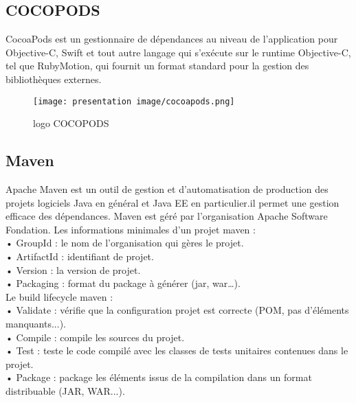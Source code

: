 \subsection{COCOPODS}
CocoaPods est un gestionnaire de dépendances au niveau de l'application pour Objective-C, Swift et tout autre langage qui s'exécute sur le runtime Objective-C, tel que RubyMotion, qui fournit un format standard pour la gestion des bibliothèques externes.
\begin{figure}[!h]
\begin{center}
\texttt{[image: presentation image/cocoapods.png]}
\end{center}
\caption{logo COCOPODS}
\end{figure}


\subsection{Maven}
Apache Maven est un outil de gestion et d'automatisation de production des projets logiciels Java en général et Java EE en particulier.il permet une gestion efficace des dépendances.
Maven est géré par l'organisation Apache Software Fondation. Les informations minimales d’un projet maven :\\

• GroupId : le nom de l’organisation qui gères le projet.\\

• ArtifactId : identifiant de projet.\\

• Version : la version de projet.\\

• Packaging : format du package à générer (jar, war…).\\

Le build lifecycle maven :\\

• Validate : vérifie que la configuration projet est correcte (POM, pas d'éléments manquants...).\\

• Compile : compile les sources du projet.\\

• Test : teste le code compilé avec les classes de tests unitaires contenues dans le projet.\\

• Package : package les éléments issus de la compilation dans un format distribuable (JAR, WAR...).\\

